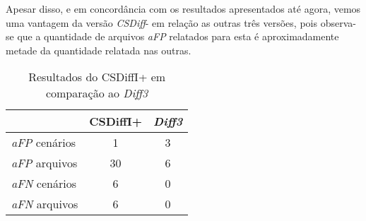 Apesar disso, e em concordância com os resultados apresentados até agora, vemos uma vantagem da versão \emph{CSDiff}- em relação as
outras três versões, pois observa-se que a quantidade de arquivos \emph{aFP} relatados para esta é aproximadamente metade da
quantidade relatada nas outras.

\begin{table}[ht]
	\begin{center}
		\begin{tabular}{|l|c|c|}
			\hline
			\textbf{ }   & \textbf{CSDiffI+} & \textbf{\emph{Diff3}} \\
			\hline
			\emph{aFP} cenários & 1                 & 3                     \\
			\emph{aFP} arquivos & 30                & 6                     \\
			\emph{aFN} cenários & 6                 & 0                     \\
			\emph{aFN} arquivos & 6                 & 0                     \\
			\hline
		\end{tabular}
	\end{center}
	\caption{Resultados do CSDiffI+ em comparação ao \emph{Diff3}}\label{csdiff_indentation_plus_afp_afn}
\end{table}

